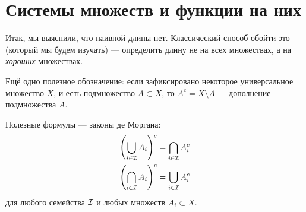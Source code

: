 \documentclass[../measure-theory.tex]{subfiles}
\begin{document}
\section{Системы множеств и функции на них}

Итак, мы выяснили, что наивной длины нет. Классический способ обойти это (который мы будем изучать) --- определить длину не на всех множествах, а на \textit{хороших} множествах.

\begin{notatn*}
 Ещё одно полезное обозначение: если зафиксировано некоторое универсальное множество $X$, и есть подмножество $A \subset X$, то $A^{c} = X \setminus A$ --- дополнение подмножества $A$.
\end{notatn*}

\begin{prop*}
 Полезные формулы --- законы де Моргана:
 \begin{align*}
  \left( \bigcup_{i \in \mathcal{I}} A_i \right)^c &= \bigcap_{i \in \mathcal{I}} A_i^c \\
  \left( \bigcap_{i \in \mathcal{I}} A_i \right)^c &= \bigcup_{i \in \mathcal{I}} A_i^c
 \end{align*} для любого семейства $ \mathcal{I} $ и любых множеств $ A_i \subset X $.
\end{prop*}
\end{document}
